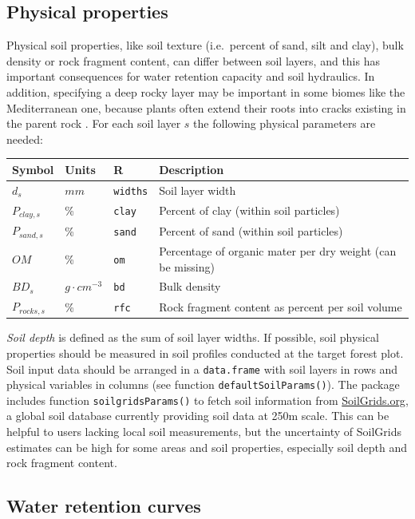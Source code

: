 \documentclass[]{book}
\begin{document}
\subsection{Physical properties}\label{physical-properties}

Physical soil properties, like soil texture (i.e.~percent of sand, silt
and clay), bulk density or rock fragment content, can differ between
soil layers, and this has important consequences for water retention
capacity and soil hydraulics. In addition, specifying a deep rocky layer
may be important in some biomes like the Mediterranean one, because
plants often extend their roots into cracks existing in the parent rock
\citep{Ruffault2013}. For each soil layer \(s\) the following physical
parameters are needed:

\begin{longtable}[]{@{}llll@{}}
\toprule
Symbol & Units & R & Description\tabularnewline
\midrule
\endhead
\(d_{s}\) & \(mm\) & \texttt{widths} & Soil layer width\tabularnewline
\(P_{clay,s}\) & \% & \texttt{clay} & Percent of clay (within soil
particles)\tabularnewline
\(P_{sand,s}\) & \% & \texttt{sand} & Percent of sand (within soil
particles)\tabularnewline
\(OM\) & \% & \texttt{om} & Percentage of organic mater per dry weight
(can be missing)\tabularnewline
\(BD_{s}\) & \(g \cdot cm^{-3}\) & \texttt{bd} & Bulk
density\tabularnewline
\(P_{rocks,s}\) & \% & \texttt{rfc} & Rock fragment content as percent
per soil volume\tabularnewline
\bottomrule
\end{longtable}

\emph{Soil depth} is defined as the sum of soil layer widths. If
possible, soil physical properties should be measured in soil profiles
conducted at the target forest plot. Soil input data should be arranged
in a \texttt{data.frame} with soil layers in rows and physical variables
in columns (see function \texttt{defaultSoilParams()}). The package
includes function \texttt{soilgridsParams()} to fetch soil information
from \href{https://soilgrids.org/}{SoilGrids.org}, a global soil
database currently providing soil data at 250m scale. This can be
helpful to users lacking local soil measurements, but the uncertainty of
SoilGrids estimates can be high for some areas and soil properties,
especially soil depth and rock fragment content.

\subsection{Water retention curves}\label{water-retention-curves}
\end{document}
